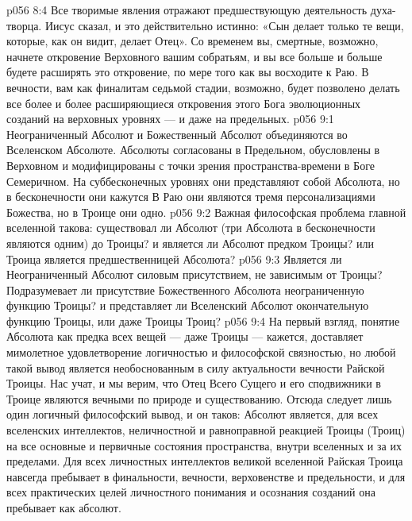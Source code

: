 \vs p056 8:4 Все творимые явления отражают предшествующую деятельность духа\hyp{}творца. Иисус сказал, и это действительно истинно: «Сын делает только те вещи, которые, как он видит, делает Отец». Со временем вы, смертные, возможно, начнете откровение Верховного вашим собратьям, и вы все больше и больше будете расширять это откровение, по мере того как вы восходите к Раю. В вечности, вам как финалитам седьмой стадии, возможно, будет позволено делать все более и более расширяющиеся откровения этого Бога эволюционных созданий на верховных уровнях --- и даже на предельных.
\vs p056 9:1 Неограниченный Абсолют и Божественный Абсолют объединяются во Вселенском Абсолюте. Абсолюты согласованы в Предельном, обусловлены в Верховном и модифицированы с точки зрения пространства\hyp{}времени в Боге Семеричном. На суббесконечных уровнях они представляют собой  Абсолюта, но в бесконечности они кажутся  В Раю они являются тремя персонализациями Божества, но в Троице они  одно.
\vs p056 9:2 \pc Важная философская проблема главной вселенной такова: существовал ли Абсолют (три Абсолюта в бесконечности являются одним) до Троицы? и является ли Абсолют предком Троицы? или Троица является предшественницей Абсолюта?
\vs p056 9:3 Является ли Неограниченный Абсолют силовым присутствием, не зависимым от Троицы? Подразумевает ли присутствие Божественного Абсолюта неограниченную функцию Троицы? и представляет ли Вселенский Абсолют окончательную функцию Троицы, или даже Троицы Троиц?
\vs p056 9:4 На первый взгляд, понятие Абсолюта как предка всех вещей --- даже Троицы --- кажется, доставляет мимолетное удовлетворение логичностью и философской связностью, но любой такой вывод является необоснованным в силу актуальности вечности Райской Троицы. Нас учат, и мы верим, что Отец Всего Сущего и его сподвижники в Троице являются вечными по природе и существованию. Отсюда следует лишь один логичный философский вывод, и он таков: Абсолют является, для всех вселенских интеллектов, неличностной и равноправной реакцией Троицы (Троиц) на все основные и первичные состояния пространства, внутри вселенных и за их пределами. Для всех личностных интеллектов великой вселенной Райская Троица навсегда пребывает в финальности, вечности, верховенстве и предельности, и для всех практических целей личностного понимания и осознания созданий она пребывает как абсолют.
